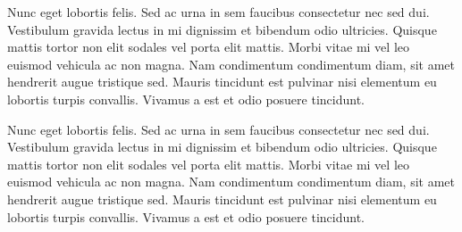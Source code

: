 \documentclass{carver-cyberlaw}
\begin{document}
Nunc eget lobortis felis. Sed ac urna in sem faucibus consectetur nec sed dui. 
Vestibulum gravida lectus in mi dignissim et bibendum odio ultricies. Quisque 
mattis tortor non elit sodales vel porta elit mattis. Morbi vitae mi vel leo 
euismod vehicula ac non magna. Nam condimentum condimentum diam, sit amet 
hendrerit augue tristique sed. Mauris tincidunt est pulvinar nisi elementum eu 
lobortis turpis convallis. Vivamus a est et odio posuere tincidunt.

Nunc eget lobortis felis. Sed ac urna in sem faucibus consectetur nec sed dui. 
Vestibulum gravida lectus in mi dignissim et bibendum odio ultricies. Quisque 
mattis tortor non elit sodales vel porta elit mattis. Morbi vitae mi vel leo 
euismod vehicula ac non magna. Nam condimentum condimentum diam, sit amet 
hendrerit augue tristique sed. Mauris tincidunt est pulvinar nisi elementum eu 
lobortis turpis convallis. Vivamus a est et odio posuere tincidunt.
\end{document}
